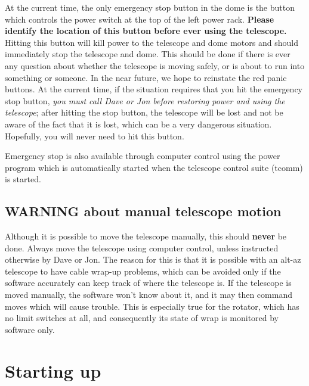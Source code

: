 \documentclass[10pt]{report}
\renewcommand{\[}{\begin{eqnarray}}
\renewcommand{\]}{\end{eqnarray}}
\begin{document}
At the current time, the only emergency stop button in the dome is the
button which controls the power switch at the top of the left power rack.
\textbf{Please identify the location of this button before ever using
the telescope.}
Hitting this button will kill power to the telescope and dome motors and
should immediately stop the telescope and dome.  This should
be done if there is ever any question about whether the telescope is
moving safely, or is about to run into something or someone.
In the near future, we hope to reinstate the red panic buttons.
At the current time, if the situation requires that you hit the emergency
stop button, \textit{you must call Dave or Jon before restoring power and
using the telescope}; after hitting the stop button, the telescope will
be lost and not be aware of the fact that it is lost, which can be a
very dangerous situation. Hopefully, you will never need to hit this
button.

Emergency stop is also available through computer control using the
power program which is automatically started when the telescope control
suite (tcomm) is started.


\section{WARNING about manual telescope motion}

Although it is possible to move the telescope manually, this should {\bf never}
be done. Always move the telescope using computer control, unless instructed
otherwise by Dave or Jon. The reason for this is that it is possible with
an alt-az telescope to have cable wrap-up problems, which can be avoided
only if the software accurately can keep track of where the telescope
is. If the telescope is moved manually, the software won't know about it,
and it may then command moves which will cause trouble. This is especially
true for the rotator, which has no limit switches at all, and consequently
its state of wrap is monitored by software only.

\chapter{Starting up}
\end{document}
